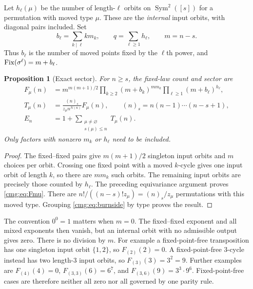 \documentclass[11pt,letterpaper]{article}
\numberwithin{equation}{section}
\newtheorem{proposition}[theorem]{Proposition}
\theoremstyle{definition}\newtheorem{definition}[theorem]{Definition}
\theoremstyle{remark}\newtheorem{remark}[theorem]{Remark}
\newcommand{\Sym}{\operatorname{Sym}}\newcommand{\ee}{\mathrm e}
\begin{document}
Let $h_\ell(\mu)$ be the number of length-$\ell$ orbits on $\Sym^2([s])$ for a permutation with moved type $\mu$. These are the \emph{internal} input orbits, with diagonal pairs included. Set
\begin{equation}\label{cmg:eq:bq}
 b_\ell=\sum_{k\mid\ell}km_k,\qquad q=\sum_{\ell\ge1}h_\ell,\qquad m=n-s.
\end{equation}
Thus $b_\ell$ is the number of moved points fixed by the $\ell$th power, and $\operatorname{Fix}(\sigma^\ell)=m+b_\ell$.

\begin{proposition}[Exact sector]\label{cmg:prop:exact}
For $n\ge s$, the fixed-law count and sector are
\begin{align}
 F_\mu(n)&=m^{m(m+1)/2}
 \prod_{k\ge2}(m+b_k)^{m m_k}
 \prod_{\ell\ge1}(m+b_\ell)^{h_\ell},\label{cmg:eq:Fmu}\\
 T_\mu(n)&=\frac{(n)_s}{z_\mu n^{N(n)}}F_\mu(n),
 \qquad (n)_s=n(n-1)\cdots(n-s+1),\label{cmg:eq:sector}\\
 E_n&=1+\sum_{\substack{\mu\ne\varnothing\\s(\mu)\le n}}T_\mu(n).\label{cmg:eq:Esector}
\end{align}
Only factors with nonzero $m_k$ or $h_\ell$ need to be included.
\end{proposition}
\begin{proof}
The fixed--fixed pairs give $m(m+1)/2$ singleton input orbits and $m$ choices per orbit. Crossing one fixed point with a moved $k$-cycle gives one input orbit of length $k$, so there are $m m_k$ such orbits. The remaining input orbits are precisely those counted by $h_\ell$. The preceding equivariance argument proves \eqref{cmg:eq:Fmu}. There are $n!/((n-s)!z_\mu)=(n)_s/z_\mu$ permutations with this moved type. Grouping \eqref{cmg:eq:burnside} by type proves the result.
\end{proof}

The convention $0^0=1$ matters when $m=0$. The fixed--fixed exponent and all mixed exponents then vanish, but an internal orbit with no admissible output gives zero. There is no division by $m$. For example a fixed-point-free transposition has one singleton input orbit $\{1,2\}$, so $F_{(2)}(2)=0$. A fixed-point-free $3$-cycle instead has two length-$3$ input orbits, so $F_{(3)}(3)=3^2=9$. Further examples are $F_{(4)}(4)=0$, $F_{(3,3)}(6)=6^7$, and $F_{(3,6)}(9)=3^3\cdot9^6$. Fixed-point-free cases are therefore neither all zero nor all governed by one parity rule.
\end{document}
